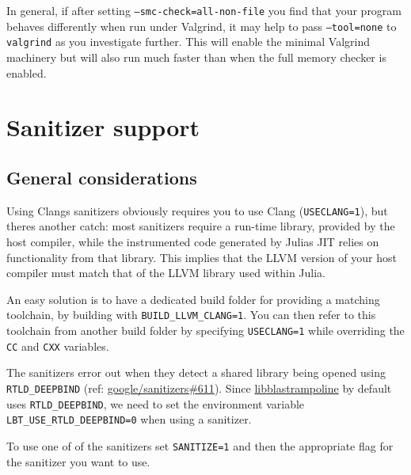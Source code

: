 In general, if after setting \texttt{--smc-check=all-non-file} you find that your program behaves differently when run under Valgrind, it may help to pass \texttt{--tool=none} to \texttt{valgrind} as you investigate further.  This will enable the minimal Valgrind machinery but will also run much faster than when the full memory checker is enabled.



\hypertarget{7868060637958278195}{}


\section{Sanitizer support}



\hypertarget{527857279218691176}{}


\subsection{General considerations}



Using Clang{\textquotesingle}s sanitizers obviously requires you to use Clang (\texttt{USECLANG=1}), but there{\textquotesingle}s another catch: most sanitizers require a run-time library, provided by the host compiler, while the instrumented code generated by Julia{\textquotesingle}s JIT relies on functionality from that library. This implies that the LLVM version of your host compiler must match that of the LLVM library used within Julia.



An easy solution is to have a dedicated build folder for providing a matching toolchain, by building with \texttt{BUILD\_LLVM\_CLANG=1}. You can then refer to this toolchain from another build folder by specifying \texttt{USECLANG=1} while overriding the \texttt{CC} and \texttt{CXX} variables.



The sanitizers error out when they detect a shared library being opened using \texttt{RTLD\_DEEPBIND} (ref: \href{https://github.com/google/sanitizers/issues/611}{google/sanitizers\#611}). Since \href{https://github.com/staticfloat/libblastrampoline}{libblastrampoline} by default uses \texttt{RTLD\_DEEPBIND}, we need to set the environment variable \texttt{LBT\_USE\_RTLD\_DEEPBIND=0} when using a sanitizer.



To use one of of the sanitizers set \texttt{SANITIZE=1} and then the appropriate flag for the sanitizer you want to use.



